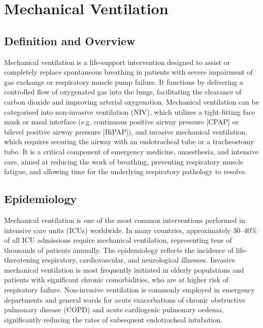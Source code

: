 \chapter{Mechanical Ventilation}

\section*{Definition and Overview}
Mechanical ventilation is a life-support intervention designed to assist or completely replace spontaneous breathing in patients with severe impairment of gas exchange or respiratory muscle pump failure. It functions by delivering a controlled flow of oxygenated gas into the lungs, facilitating the clearance of carbon dioxide and improving arterial oxygenation. Mechanical ventilation can be categorised into non-invasive ventilation (NIV), which utilizes a tight-fitting face mask or nasal interface (e.g. continuous positive airway pressure [CPAP] or bilevel positive airway pressure [BiPAP]), and invasive mechanical ventilation, which requires securing the airway with an endotracheal tube or a tracheostomy tube. It is a critical component of emergency medicine, anaesthesia, and intensive care, aimed at reducing the work of breathing, preventing respiratory muscle fatigue, and allowing time for the underlying respiratory pathology to resolve.

\section*{Epidemiology}
Mechanical ventilation is one of the most common interventions performed in intensive care units (ICUs) worldwide. In many countries, approximately 30--40\% of all ICU admissions require mechanical ventilation, representing tens of thousands of patients annually. The epidemiology reflects the incidence of life-threatening respiratory, cardiovascular, and neurological illnesses. Invasive mechanical ventilation is most frequently initiated in elderly populations and patients with significant chronic comorbidities, who are at higher risk of respiratory failure. Non-invasive ventilation is commonly employed in emergency departments and general wards for acute exacerbations of chronic obstructive pulmonary disease (COPD) and acute cardiogenic pulmonary oedema, significantly reducing the rates of subsequent endotracheal intubation.

